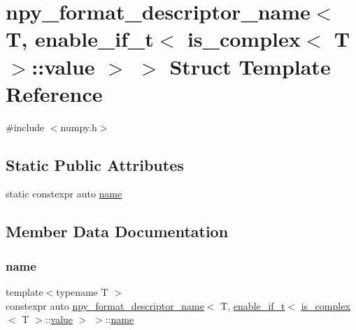 \hypertarget{structnpy__format__descriptor__name_3_01_t_00_01enable__if__t_3_01is__complex_3_01_t_01_4_1_1value_01_4_01_4}{}\section{npy\+\_\+format\+\_\+descriptor\+\_\+name$<$ T, enable\+\_\+if\+\_\+t$<$ is\+\_\+complex$<$ T $>$\+::value $>$ $>$ Struct Template Reference}
\label{structnpy__format__descriptor__name_3_01_t_00_01enable__if__t_3_01is__complex_3_01_t_01_4_1_1value_01_4_01_4}


{\ttfamily \#include $<$numpy.\+h$>$}

\subsection*{Static Public Attributes}
\begin{DoxyCompactItemize}
\item 
static constexpr auto \mbox{\hyperlink{structnpy__format__descriptor__name_3_01_t_00_01enable__if__t_3_01is__complex_3_01_t_01_4_1_1value_01_4_01_4_a91a1cf06542fda2a3f429360d083ecdc}{name}}
\end{DoxyCompactItemize}


\subsection{Member Data Documentation}
\mbox{\label{structnpy__format__descriptor__name_3_01_t_00_01enable__if__t_3_01is__complex_3_01_t_01_4_1_1value_01_4_01_4_a91a1cf06542fda2a3f429360d083ecdc}} 
\subsubsection{\texorpdfstring{name}{name}}
{\footnotesize\ttfamily template$<$typename T $>$ \\
constexpr auto \mbox{\hyperlink{structnpy__format__descriptor__name}{npy\+\_\+format\+\_\+descriptor\+\_\+name}}$<$ T, \mbox{\hyperlink{detail_2common_8h_a012819c9e8b5e04872a271f50f8b8196}{enable\+\_\+if\+\_\+t}}$<$ \mbox{\hyperlink{structis__complex}{is\+\_\+complex}}$<$ T $>$\+::\mbox{\hyperlink{_s_d_l__opengl__glext_8h_a8ad81492d410ff2ac11f754f4042150f}{value}} $>$ $>$\+::\mbox{\hyperlink{structname}{name}}\hspace{0.3cm}{\ttfamily [static]}}

